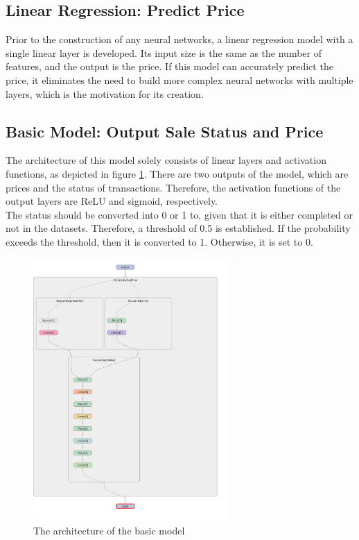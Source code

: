 \documentclass[12pt,twoside]{report}
\begin{document}
\subsection{Linear Regression: Predict Price}
\label{linear_regression_model_construction}
Prior to the construction of any neural networks, a linear regression model with a single linear layer is developed. Its input size is the same as the number of features, and the output is the price. If this model can accurately predict the price, it eliminates the need to build more complex neural networks with multiple layers, which is the motivation for its creation. 

\subsection{Basic Model: Output Sale Status and Price}
\label{basic_model_price_status_construction}
The architecture of this model solely consists of linear layers and activation functions, as depicted in figure \ref{basic_model_layout}. There are two outputs of the model, which are prices and the status of transactions. Therefore, the activation functions of the output layers are ReLU and sigmoid, respectively.
\\

The status should be converted into 0 or 1 to, given that it is either completed or not in the datasets. Therefore, a threshold of 0.5 is established. If the probability exceeds the threshold, then it is converted to 1. Otherwise, it is set to 0.

\begin{figure}[!htbp]
	\centering
	\includegraphics[height=10cm]{basic_model_layout}
	\caption{The architecture of the basic model}
	\label{basic_model_layout}
\end{figure}
\end{document}

